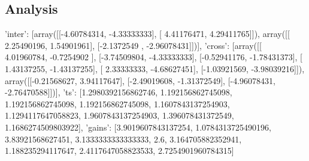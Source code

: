 \documentclass[twoside]{article}
\begin{document}
\begin{multicols}{2}
    \section{Analysis}
{'inter': [array([[-4.60784314, -4.33333333],
       [ 4.41176471,  4.29411765]]), array([[ 2.25490196,  1.54901961],
       [-2.1372549 , -2.96078431]])], 'cross': [array([[ 4.01960784, -0.7254902 ],
       [-3.74509804, -4.33333333],
       [-0.52941176, -1.78431373],
       [ 1.43137255, -1.43137255],
       [ 2.33333333, -4.68627451],
       [-1.03921569, -3.98039216]]), array([[-0.21568627,  3.94117647],
       [-2.49019608, -1.31372549],
       [-4.96078431, -2.76470588]])], 'ts': [1.2980392156862746, 1.192156862745098, 1.192156862745098, 1.192156862745098, 1.1607843137254903, 1.1294117647058823, 1.9607843137254903, 1.396078431372549, 1.1686274509803922], 'gains': [3.9019607843137254, 1.0784313725490196, 3.83921568627451, 3.1333333333333333, 2.6, 3.164705882352941, 1.188235294117647, 2.4117647058823533, 2.7254901960784315]}


\end{multicols}

%
%
\end{document}
